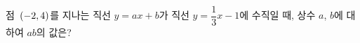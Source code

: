 점~$(-2{,}\mkern3mu\mathopen{}4)$를 지나는 직선 $y=ax+b$가 직선 $y=\dfrac{1}{3}x-1$에 수직일 때, 상수 $a$, $b$에 대하여 $ab$의 값은?
